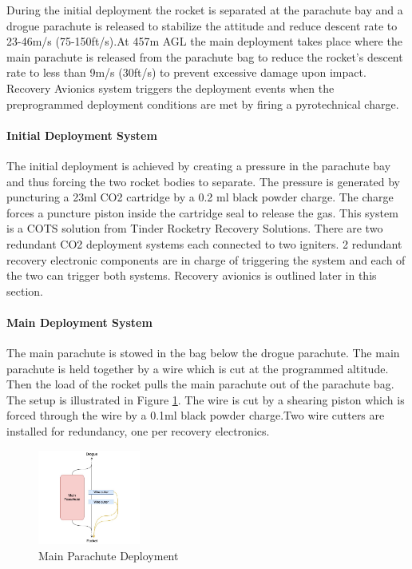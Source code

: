 During the initial deployment the rocket is separated at the parachute bay and a drogue parachute is released to stabilize the attitude and reduce descent rate to 23-46m/s (75-150ft/s).At 457m AGL the main deployment takes place where the main parachute is released from the parachute bag to reduce the rocket's descent rate to less than 9m/s (30ft/s) to prevent excessive damage upon impact. Recovery Avionics system triggers the deployment events when the preprogrammed deployment conditions are met by firing a pyrotechnical charge.

\paragraph{Initial Deployment System}
The initial deployment is achieved by creating a pressure in the parachute bay and thus forcing the two rocket bodies to separate. The pressure is generated by puncturing a 23ml CO2 cartridge by a 0.2 ml black powder charge. The charge forces a puncture piston inside the cartridge seal to release the gas. This system is a COTS solution from Tinder Rocketry Recovery Solutions.
There are two redundant CO2 deployment systems each connected to two igniters. 2 redundant recovery electronic components are in charge of triggering the system and each of the two can trigger both systems. Recovery avionics is outlined later in this section.

\paragraph{Main Deployment System}
The main parachute is stowed in the bag below the drogue parachute. The main parachute is held together by a wire which is cut at the programmed altitude. Then the load of the rocket pulls the main parachute out of the parachute bag. The setup is illustrated in Figure \ref{f:recovery_main_deployment}. The wire is cut by a shearing piston which is forced through the wire by a 0.1ml black powder charge.Two wire cutters are installed for redundancy, one per recovery electronics.

\begin{figure}[h!]
 	\centering
        \includegraphics[width=0.3\textwidth]{img/recovery_main_deployment.jpg}
        \caption{Main Parachute Deployment}
        \label{f:recovery_main_deployment}
 \end{figure}
 
